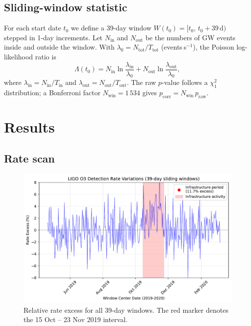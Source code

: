 \documentclass[
  reprint,
  nofootinbib,
  amsmath,amssymb,
  aps,prd,
  superscriptaddress
]{revtex4-2}
\begin{document}
\subsection{Sliding-window statistic}\label{sec:stat}
For each start date \(t_0\) we define a 39-day window
\(W(t_0) = [t_0,\,t_0 + 39\,\text{d})\) stepped in 1-day increments.
Let \(N_{\text{in}}\) and \(N_{\text{out}}\) be the numbers of GW
events inside and outside the window.  With
\(\lambda_0 = N_{\text{tot}}/T_{\text{tot}}\)
(events s\(^{-1}\)), the Poisson log-likelihood ratio is
\begin{equation}
\Lambda(t_0)=
N_{\text{in}}\ln\!\frac{\lambda_{\text{in}}}{\lambda_0}+
N_{\text{out}}\ln\!\frac{\lambda_{\text{out}}}{\lambda_0},
\end{equation}
where \(\lambda_{\text{in}} = N_{\text{in}}/T_{\text{in}}\) and
\(\lambda_{\text{out}} = N_{\text{out}}/T_{\text{out}}\).
The raw \(p\)-value follows a \(\chi^{2}_{\!1}\) distribution; a
Bonferroni factor \(N_{\text{win}} = 1\,534\) gives
\(p_\text{corr} = N_{\text{win}}\,p_\text{raw}\).

\section{Results}

\subsection{Rate scan}
\begin{figure}
  \includegraphics[width=\linewidth]{fig-rate-scan.pdf}
  \caption{Relative rate excess for all 39-day windows.
           The red marker denotes the 15 Oct – 23 Nov 2019 interval.}
  \label{fig:scan}
\end{figure}
\end{document}
